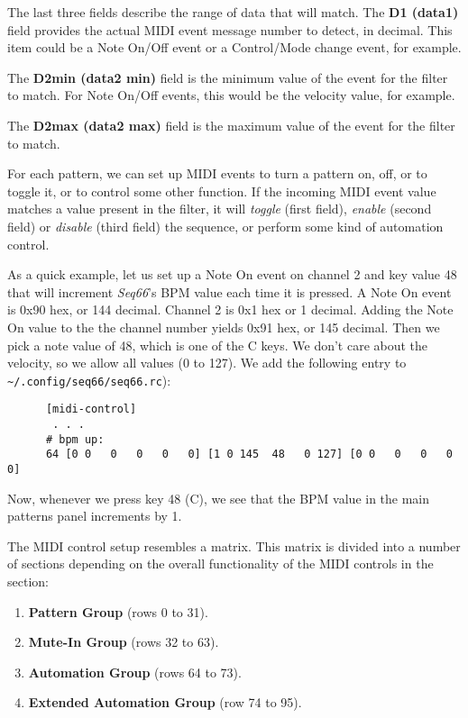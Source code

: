    The last three fields describe the range of data that will match.  The
   \textbf{D1 (data1)} field provides the actual MIDI event message number to
   detect, in decimal.  This item could be a Note On/Off event or a
   Control/Mode change event, for example.

   The \textbf{D2min (data2 min)} field is the minimum value of the event for
   the filter to match. For Note On/Off events, this would be the velocity
   value, for example.

   The \textbf{D2max (data2 max)} field is the maximum value of the event for
   the filter to match.


   For each pattern, we can set up MIDI events to turn a 
   pattern on, off, or to toggle it, or to control some other function.
   If the incoming MIDI event value matches a value present in the filter, it
   will \textsl{toggle} (first field), \textsl{enable} (second field) or
   \textsl{disable} (third field) the sequence, or perform some kind of automation
   control.

   As a quick example, let us set up a Note On event on channel 2 and key value
   48 that will increment \textsl{Seq66}'s BPM value each time it is
   pressed.  A Note On event is 0x90 hex, or 144 decimal.  Channel 2 is 0x1 hex
   or 1 decimal.   Adding the Note On value to the the channel number yields
   0x91 hex, or 145 decimal.  Then we pick a note value of 48, which is one of
   the C keys.  We don't care about the velocity, so we allow all values (0 to
   127).  We add the following entry to
   \texttt{\textasciitilde/.config/seq66/seq66.rc}):

   \begin{verbatim}
      [midi-control]
       . . .
      # bpm up:
      64 [0 0   0   0   0   0] [1 0 145  48   0 127] [0 0   0   0   0   0]
   \end{verbatim}

   Now, whenever we press key 48 (C), we see that the BPM value in the main
   patterns panel increments by 1.

   The MIDI control setup resembles a matrix.  This matrix is divided into a
   number of sections depending on the overall functionality of the MIDI
   controls in the section:

   \begin{enumerate}
      \item \textbf{Pattern Group} (rows 0 to 31).
      \item \textbf{Mute-In Group} (rows 32 to 63).
      \item \textbf{Automation Group} (rows 64 to 73).
      \item \textbf{Extended Automation Group} (row 74 to 95).
   \end{enumerate}

